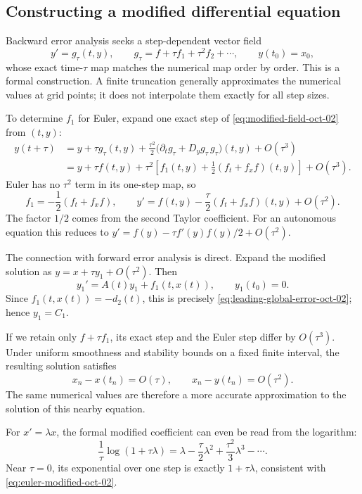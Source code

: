\subsection{Constructing a modified differential equation}

Backward error analysis seeks a step-dependent vector field
\begin{equation}\label{eq:modified-field-oct-02}
 y'=g_\tau(t,y),\qquad
 g_\tau=f+\tau f_1+\tau^2f_2+\cdots,
 \qquad y(t_0)=x_0,
\end{equation}
whose exact time-\(\tau\) map matches the numerical map order by
order. This is a formal construction. A finite truncation generally
approximates the numerical values at grid points; it does not
interpolate them exactly for all step sizes.

To determine \(f_1\) for Euler, expand one exact step of
\eqref{eq:modified-field-oct-02} from \((t,y)\):
\begin{align*}
 y(t+\tau)
  &=y+\tau g_\tau(t,y)
       +\frac{\tau^2}{2}
          \bigl(\partial_tg_\tau+D_yg_\tau\,g_\tau\bigr)(t,y)
       +O(\tau^3)\\
  &=y+\tau f(t,y)
       +\tau^2\left[f_1(t,y)
                    +\frac12(f_t+f_xf)(t,y)\right]
       +O(\tau^3).
\end{align*}
Euler has no \(\tau^2\) term in its one-step map, so
\begin{equation}\label{eq:euler-modified-oct-02}
 \boxed{f_1=-\frac12(f_t+f_xf),\qquad
 y'=f(t,y)-\frac\tau2(f_t+f_xf)(t,y)+O(\tau^2).}
\end{equation}
The factor \(1/2\) comes from the second Taylor coefficient.
For an autonomous equation this reduces to
\(y'=f(y)-\tau f'(y)f(y)/2+O(\tau^2)\).

The connection with forward error analysis is direct. Expand the
modified solution as \(y=x+\tau y_1+O(\tau^2)\). Then
\[
 y_1'=A(t)y_1+f_1(t,x(t)),\qquad y_1(t_0)=0.
\]
Since \(f_1(t,x(t))=-d_2(t)\), this is precisely
\eqref{eq:leading-global-error-oct-02}; hence \(y_1=C_1\).

If we retain only \(f+\tau f_1\), its exact step and the Euler
step differ by \(O(\tau^3)\). Under uniform smoothness and
stability bounds on a fixed finite interval, the resulting solution
satisfies
\[
 x_n-x(t_n)=O(\tau),\qquad x_n-y(t_n)=O(\tau^2).
\]
The same numerical values are therefore a more accurate approximation
to the solution of this nearby equation.

For \(x'=\lambda x\), the formal modified coefficient can even be
read from the logarithm:
\[
 \frac1\tau\log(1+\tau\lambda)
 =\lambda-\frac\tau2\lambda^2+\frac{\tau^2}{3}\lambda^3-\cdots.
\]
Near \(\tau=0\), its exponential over one step is exactly
\(1+\tau\lambda\), consistent with \eqref{eq:euler-modified-oct-02}.

